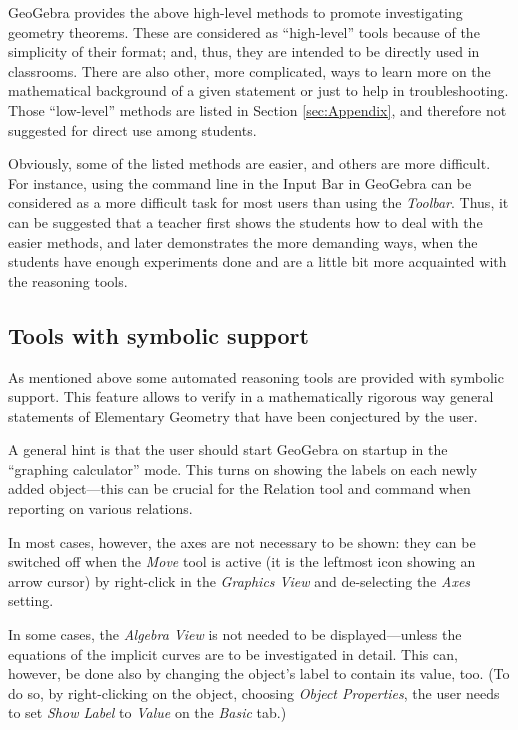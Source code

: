 \documentclass{article}
\begin{document}
GeoGebra provides the above high-level methods to promote investigating geometry theorems. These are considered as ``high-level'' tools because of the simplicity of their  format; and, thus,  they are intended to  be directly used in classrooms. There are also other, more complicated, ways to learn more on the mathematical background of a given statement or just to help in troubleshooting. Those ``low-level'' methods are listed in Section \ref{sec:Appendix}, and therefore not suggested for direct use among students.

Obviously, some of the listed methods are easier, and others are more difficult. For instance, using the command line in the Input Bar in GeoGebra can be considered as a more difficult task for most users than using the \textit{Toolbar}. Thus, it can be suggested that a teacher first shows the students how to deal with the easier methods, and later demonstrates the more demanding ways,  when the students have enough experiments done and are a little bit more acquainted with the reasoning tools.

\subsection{Tools with symbolic support}

As mentioned above some automated reasoning tools are provided with symbolic support. This feature allows to verify in a mathematically rigorous way general statements of Elementary Geometry that have been conjectured by the user.

A general hint is that the user should start GeoGebra on startup in the ``graphing calculator'' mode. This turns on showing the labels on each newly added object---this can be crucial for the Relation tool and command when reporting on various relations. 

In most cases, however, the axes are not necessary to be shown: they can be switched off when the \textit{Move} tool is active (it is the leftmost icon showing an arrow cursor) by right-click in the \textit{Graphics View} and de-selecting the \textit{Axes} setting.

In some cases, the \textit{Algebra View} is not needed to be displayed---unless the equations of the implicit curves are to be investigated in detail. This can,  however, be done also by changing the object's label to contain its value, too. (To do so, by right-clicking on the object, choosing \textit{Object Properties}, the user needs to set \textit{Show Label} to \textit{Value} on the \textit{Basic} tab.)
\end{document}
